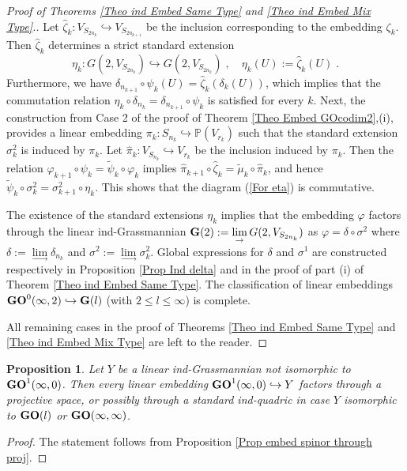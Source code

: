 \documentclass[12pt]{amsart}
\def\PP {{\mathbb P}}     %
\def\hw  {\hookrightarrow}
\newtheorem{prop}[theorem]{Proposition}
\begin{document}
\begin{proof}[Proof of Theorems \ref{Theo ind Embed Same Type} and \ref{Theo ind Embed Mix Type}.]
Let $\hat\zeta_k:V_{S_{2n_k}}\hw V_{S_{2n_{k+1}}}$ be the inclusion corresponding to the embedding $\zeta_k$. Then $\hat\zeta_k$ determines a strict standard extension 
$$
\eta_k:G(2,V_{S_{2n_{k}}})\hw G(2,V_{S_{2n_{k}}}) \;,\quad \eta_k(U):=\hat\zeta_k(U)\;.
$$
Furthermore, we have $\delta_{n_{k+1}}\circ \psi_k (U)=\hat\zeta_k( \delta_k(U))$, which implies that the commutation relation $\eta_k\circ\delta_{n_k}=\delta_{n_{k+1}}\circ \psi_k$ is satisfied for every $k$. Next, the construction from Case 2 of the proof of Theorem \ref{Theo Embed GOcodim2},(i), provides a linear embedding $\pi_k:S_{n_k}\hw\PP(V_{r_k})$ such that the standard extension $\sigma^2_{k}$ is induced by $\pi_k$. Let $\hat \pi_k:V_{S_{n_k}}\hw V_{r_k}$ be the inclusion induced by $\pi_k$. Then the relation $\varphi_{k+1}\circ\psi_k=\tilde\psi_k\circ\varphi_k$ implies $\hat\pi_{k+1}\circ\hat\zeta_k=\tilde\mu_k\circ\hat\pi_k$, and hence $\tilde\psi_k\circ\sigma^2_{k}=\sigma^2_{k+1}\circ\eta_k$. This shows that the diagram (\ref{For eta}) is commutative.

The existence of the standard extensions $\eta_k$ implies that the embedding $\varphi$ factors through the linear ind-Grassmannian ${\bf G}(2):=\lim\limits_\to G(2,V_{S_{2n_k}})$ as $\varphi=\delta \circ \sigma^2$ where $\delta:=\lim\limits_\to \delta_{n_k}$ and $\sigma^2:=\lim\limits_\to \sigma^2_k$. Global expressions for $\delta$ and $\sigma^1$ are constructed respectively in Proposition \ref{Prop Ind delta} and in the proof of part (i) of Theorem \ref{Theo ind Embed Same Type}. The classification of linear embeddings ${\bf GO}^0(\infty,2)\hw {\bf G}(l)$ (with $2\leq l\leq \infty$) is complete.

All remaining cases in the proof of Theorems \ref{Theo ind Embed Same Type} and \ref{Theo ind Embed Mix Type} are left to the reader.
\end{proof}

\begin{prop}
Let $Y$ be a linear ind-Grassmannian not isomorphic to ${\bf GO}^1(\infty,0)$. Then every linear embedding ${\bf GO}^1(\infty,0)\hw Y$ factors through a projective space, or possibly through a standard ind-quadric in case $Y$ isomorphic to ${\bf GO}(l)$ or ${\bf GO}(\infty,\infty)$.
\end{prop}

\begin{proof}
The statement follows from Proposition \ref{Prop embed spinor through proj}.
\end{proof}
\end{document}
